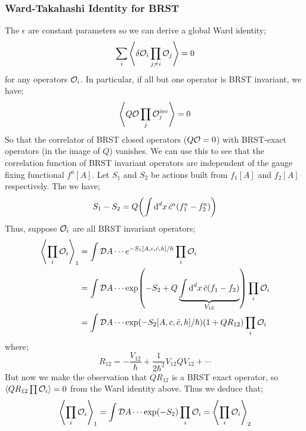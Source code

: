 \subsubsection{Ward-Takahashi Identity for BRST}
The $\epsilon$ are constant parameters so we can derive a global Ward identity;
\begin{equation}
\sum_{i}{\left< \delta \mO_i \prod_{j \neq i}{\mO_j} \right>} = 0
\end{equation}
for any operators $\mathcal{O}_i$. In particular, if all but one operator is BRST invariant, we have;
\begin{equation}
\left< Q\mO \prod_{j}\mO_j^{\text{inv}} \right> = 0
\end{equation}
So that the correlator of BRST closed operators ($Q\mathcal{O} = 0$) with BRST-exact operators (in the image of $Q$) vanishes. We can use this to see that the correlation function of BRST invariant operators are independent of the gauge fixing functional $f^a[A]$. Let $S_1$ and $S_2$ be actions built from $f_1[A]$ and $f_2[A]$ respectively. The we have;
\begin{equation*}
S_1 - S_2 = Q\left(\int{\upd{^d x}\bar{c}^a (f_1^a - f_2^a)}\right)
\end{equation*}
Thus, suppose $\mathcal{O}_i$ are all BRST invariant operators;
\begin{align*}
\left< \prod_{i}\mO_{i} \right>_1 &= \int{\mD A \cdots e^{-S_1[A, c, \bar{c}, h]/\hbar}\prod_{i}\mO_i} \\
&= \int{\mD A \cdots \exp\left(-S_2 + Q\underbrace{\int{\upd{^d x}\bar{c}(f_1 - f_2)}}_{V_{12}}\right)\prod_{i}\mO_i} \\
&= \int{\mD A \cdots \exp\left(-S_2[A, c, \bar{c}, h]/\hbar\right)\left(1 + QR_{12}\right)\prod_{i}\mO_i}
\end{align*}
where;
\begin{equation*}
R_{12} = -\frac{V_{12}}{\hbar} + \frac{1}{2\hbar^2}V_{12}Q V_{12} + \cdots
\end{equation*}
But now we make the observation that $QR_{12}$ is a BRST exact operator, so $\left< QR_{12}\prod \mO_i \right> = 0$ from the Ward identity above. Thus we deduce that;
\begin{equation*}
\left< \prod_{i}\mO_i \right>_1 = \int{\mD A \cdots \exp\left(-S_2\right)\prod_i{\mO_i}} = \left< \prod_{i}{\mO_{i}} \right>_2
\end{equation*}
